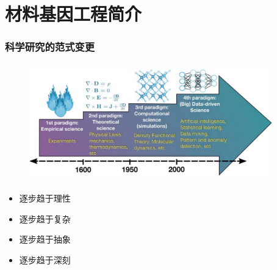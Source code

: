 %

\section{材料基因工程简介}
\frame
{
	\frametitle{科学研究的范式变更}
\begin{figure}[h!]
\vspace*{-0.28in}
\centering
\includegraphics[height=2.00in,width=4.15in]{Figures/Four_Model_3.png}
\label{Four_Model}
\end{figure}
\begin{minipage}[b]{0.48\textwidth}
 {\fontsize{7.5pt}{6.0pt}\selectfont\begin{itemize}%
	 \setlength{\itemsep}{10pt}
 \item 逐步趋于理性
 \item 逐步趋于复杂
 \end{itemize}}
\end{minipage}
\hfill
\begin{minipage}[b]{0.48\textwidth}
 {\fontsize{7.5pt}{6.0pt}\selectfont\begin{itemize}%
	 \setlength{\itemsep}{10pt}
 \item 逐步趋于抽象
 \item 逐步趋于深刻
 \end{itemize}}
\end{minipage}
}

